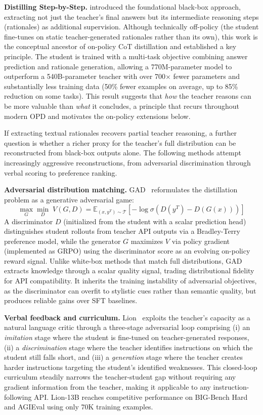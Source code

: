 \documentclass{article} %
\newcommand{\E}{\mathbb{E}}
\begin{document}
\textbf{Distilling Step-by-Step.} \citet{2305.02301} introduced the foundational black-box approach, extracting not just the teacher's final answers but its intermediate reasoning steps (rationales) as additional supervision. Although technically off-policy (the student fine-tunes on static teacher-generated rationales rather than its own), this work is the conceptual ancestor of on-policy CoT distillation and established a key principle. The student is trained with a multi-task objective combining answer prediction and rationale generation, allowing a 770M-parameter model to outperform a 540B-parameter teacher with over 700$\times$ fewer parameters and substantially less training data (50\% fewer examples on average, up to 85\% reduction on some tasks). This result suggests that \emph{how} the teacher reasons can be more valuable than \emph{what} it concludes, a principle that recurs throughout modern OPD and motivates the on-policy extensions below.

If extracting textual rationales recovers partial teacher reasoning, a further question is whether a richer proxy for the teacher's full distribution can be reconstructed from black-box outputs alone. The following methods attempt increasingly aggressive reconstructions, from adversarial discrimination through verbal scoring to preference ranking.

\textbf{Adversarial distribution matching.} GAD~\citep{2511.10643} reformulates the distillation problem as a generative adversarial game:
\begin{equation*}
    \max_{G} \min_{D}\; V(G, D) = \E_{(x, y^T) \sim \mathcal{T}} \left[ -\log \sigma\!\left( D(y^T) - D(G(x)) \right) \right]
\end{equation*}
A discriminator $D$ (initialized from the student with a scalar prediction head) distinguishes student rollouts from teacher API outputs via a Bradley-Terry preference model, while the generator $G$ maximizes $V$ via policy gradient (implemented as GRPO) using the discriminator score as an evolving on-policy reward signal. Unlike white-box methods that match full distributions, GAD extracts knowledge through a scalar quality signal, trading distributional fidelity for API compatibility. It inherits the training instability of adversarial objectives, as the discriminator can overfit to stylistic cues rather than semantic quality, but produces reliable gains over SFT baselines.

\textbf{Verbal feedback and curriculum.} Lion~\citep{2305.12870} exploits the teacher's capacity as a natural language critic through a three-stage adversarial loop comprising (i) an \emph{imitation} stage where the student is fine-tuned on teacher-generated responses, (ii) a \emph{discrimination} stage where the teacher identifies instructions on which the student still falls short, and (iii) a \emph{generation} stage where the teacher creates harder instructions targeting the student's identified weaknesses. This closed-loop curriculum steadily narrows the teacher-student gap without requiring any gradient information from the teacher, making it applicable to any instruction-following API. Lion-13B reaches competitive performance on BIG-Bench Hard and AGIEval using only 70K training examples.
\end{document}
